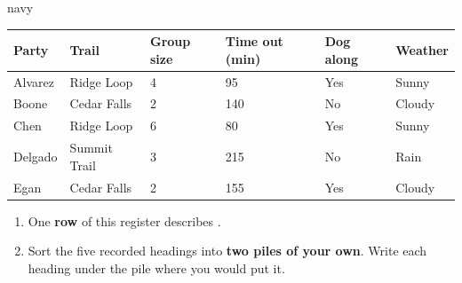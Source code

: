 \vspace{0.04in}

\begin{scenariobox}{navy}
\small
\renewcommand{\arraystretch}{1.12}
\begin{tabularx}{\linewidth}{@{} l Y Y Y Y Y @{}}
\textbf{Party} & \textbf{Trail} & \textbf{Group size} & \textbf{Time out (min)} &
\textbf{Dog along} & \textbf{Weather} \\
\hline
Alvarez  & Ridge Loop   & 4 &  95 & Yes & Sunny  \\
Boone    & Cedar Falls  & 2 & 140 & No  & Cloudy \\
Chen     & Ridge Loop   & 6 &  80 & Yes & Sunny  \\
Delgado  & Summit Trail & 3 & 215 & No  & Rain   \\
Egan     & Cedar Falls  & 2 & 155 & Yes & Cloudy \\
\hline
\end{tabularx}

\normalsize
\begin{enumerate}[label=\textbf{\alph*.}, leftmargin=1.8em, itemsep=6pt]
  \item One \textbf{row} of this register describes .
  \item Sort the five recorded headings into \textbf{two piles of your own}. Write each
        heading under the pile where you would put it.


\end{enumerate}
\end{scenariobox}
